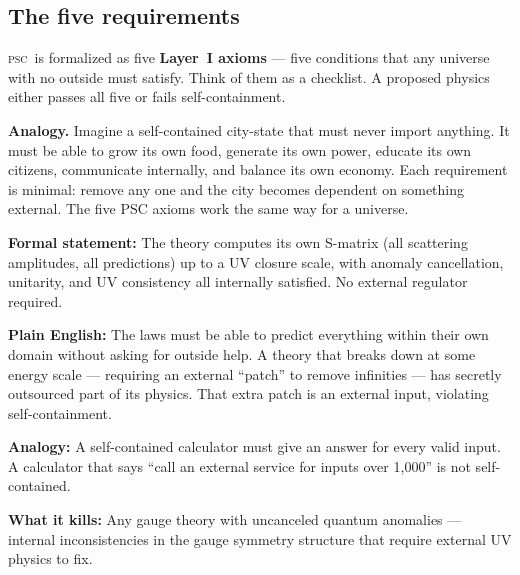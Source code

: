 \documentclass[11pt,a4paper]{article}
\newcommand{\term}[1]{\textbf{#1}}
\newcommand{\PSC}{\textsc{psc}}
\begin{document}
\subsection{The five requirements}

\PSC\ is formalized as five \term{Layer~I axioms} — five conditions that any universe
with no outside must satisfy.  Think of them as a checklist.  A proposed physics either
passes all five or fails self-containment.

\medskip

\textbf{Analogy.}  Imagine a self-contained city-state that must never import anything.
It must be able to grow its own food, generate its own power, educate its own citizens,
communicate internally, and balance its own economy.  Each requirement is minimal:
remove any one and the city becomes dependent on something external.
The five PSC axioms work the same way for a universe.

\bigskip

\begin{tcolorbox}[colback=boxgreen,colframe=green!50!black,
  title=Axiom 1 — RC: Reflexive Closure,breakable]
\textbf{Formal statement:} The theory computes its own S-matrix (all scattering
amplitudes, all predictions) up to a UV closure scale, with anomaly cancellation,
unitarity, and UV consistency all internally satisfied.  No external regulator required.

\medskip
\textbf{Plain English:} The laws must be able to predict everything within their own
domain without asking for outside help.  A theory that breaks down at some energy scale
— requiring an external ``patch'' to remove infinities — has secretly outsourced part
of its physics.  That extra patch is an external input, violating self-containment.

\medskip
\textbf{Analogy:} A self-contained calculator must give an answer for every valid input.
A calculator that says ``call an external service for inputs over 1{,}000'' is not
self-contained.

\medskip
\textbf{What it kills:} Any gauge theory with uncanceled quantum anomalies — internal
inconsistencies in the gauge symmetry structure that require external UV physics to fix.
\end{tcolorbox}

\bigskip
\end{document}

